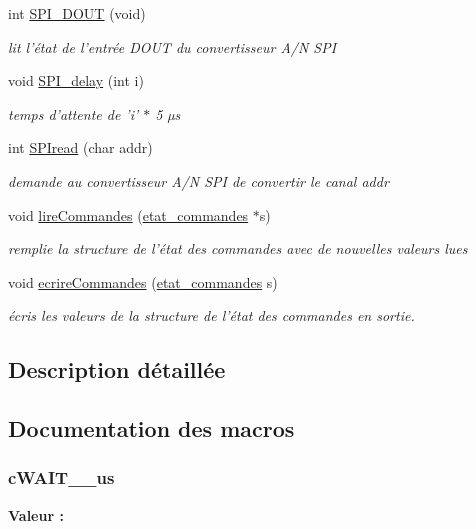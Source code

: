\begin{DoxyCompactItemize}
int \hyperlink{group___i_o_ga837457e63fcbfcc6e59b6d4c59bd7252}{S\-P\-I\-\_\-\-D\-O\-U\-T} (void)
\begin{DoxyCompactList}\small\item\em lit l'état de l'entrée D\-O\-U\-T du convertisseur A/\-N S\-P\-I \end{DoxyCompactList}\item 
void \hyperlink{group___i_o_ga2574e1f1506d0a5313c21891bef79aca}{S\-P\-I\-\_\-delay} (int i)
\begin{DoxyCompactList}\small\item\em temps d'attente de 'i' $\ast$ 5 µs \end{DoxyCompactList}\item 
int \hyperlink{group___i_o_ga5232f075d5cd2577d072721a1494eb03}{S\-P\-Iread} (char addr)
\begin{DoxyCompactList}\small\item\em demande au convertisseur A/\-N S\-P\-I de convertir le canal addr \end{DoxyCompactList}\item 
void \hyperlink{group___i_o_ga91ea6d792c13305827a81e66a1eedf87}{lire\-Commandes} (\hyperlink{structetat__commandes}{etat\-\_\-commandes} $\ast$s)
\begin{DoxyCompactList}\small\item\em remplie la structure de l'état des commandes avec de nouvelles valeurs lues \end{DoxyCompactList}\item 
void \hyperlink{group___i_o_ga85dc4c920777870405563fe56611b457}{ecrire\-Commandes} (\hyperlink{structetat__commandes}{etat\-\_\-commandes} s)
\begin{DoxyCompactList}\small\item\em écris les valeurs de la structure de l'état des commandes en sortie. \end{DoxyCompactList}\end{DoxyCompactItemize}


\subsection{Description détaillée}


\subsection{Documentation des macros}
\hypertarget{group___i_o_gad8d73a31b3d7e5ed74e525e198cc78f3}{
\subsubsection[{c\-W\-A\-I\-T\-\_\-5\-\_\-us}]{\setlength{\rightskip}{0pt plus 5cm}c\-W\-A\-I\-T\-\_\-\_\-us}}\label{group___i_o_gad8d73a31b3d7e5ed74e525e198cc78f3}
{\bfseries Valeur \-:}


